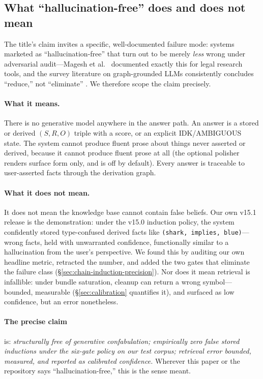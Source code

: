 \documentclass[11pt]{article}
\begin{document}
\subsection{What ``hallucination-free'' does and does not mean}
\label{sec:scoping}

The title's claim invites a specific, well-documented failure mode:
systems marketed as ``hallucination-free'' that turn out to be merely
\emph{less} wrong under adversarial audit---Magesh et
al.~\cite{magesh2024} documented exactly this for legal research
tools, and the survey literature on graph-grounded LLMs consistently
concludes ``reduce,'' not ``eliminate'' \cite{agrawal2024}. We
therefore scope the claim precisely.

\paragraph{What it means.} There is no generative model anywhere in
the answer path. An answer is a stored or derived $(S, R, O)$ triple
with a score, or an explicit IDK/AMBIGUOUS state. The system cannot
produce fluent prose about things never asserted or derived, because
it cannot produce fluent prose at all (the optional polisher renders
surface form only, and is off by default). Every answer is traceable
to user-asserted facts through the derivation graph.

\paragraph{What it does not mean.} It does not mean the knowledge
base cannot contain false beliefs. Our own v15.1 release is the
demonstration: under the v15.0 induction policy, the system
confidently stored type-confused derived facts like
\texttt{(shark, implies, blue)}---wrong facts, held with unwarranted
confidence, functionally similar to a hallucination from the user's
perspective. We found this by auditing our own headline metric,
retracted the number, and added the two gates that eliminate the
failure class (\S\ref{sec:chain-induction-precision}). Nor does it
mean retrieval is infallible: under bundle saturation, cleanup can
return a wrong symbol---bounded, measurable
(\S\ref{sec:calibration} quantifies it), and surfaced as low
confidence, but an error nonetheless.

\paragraph{The precise claim} is: \emph{structurally free of
generative confabulation; empirically zero false stored inductions
under the six-gate policy on our test corpus; retrieval error
bounded, measured, and reported as calibrated confidence.} Wherever
this paper or the repository says ``hallucination-free,'' this is
the sense meant.
\end{document}
